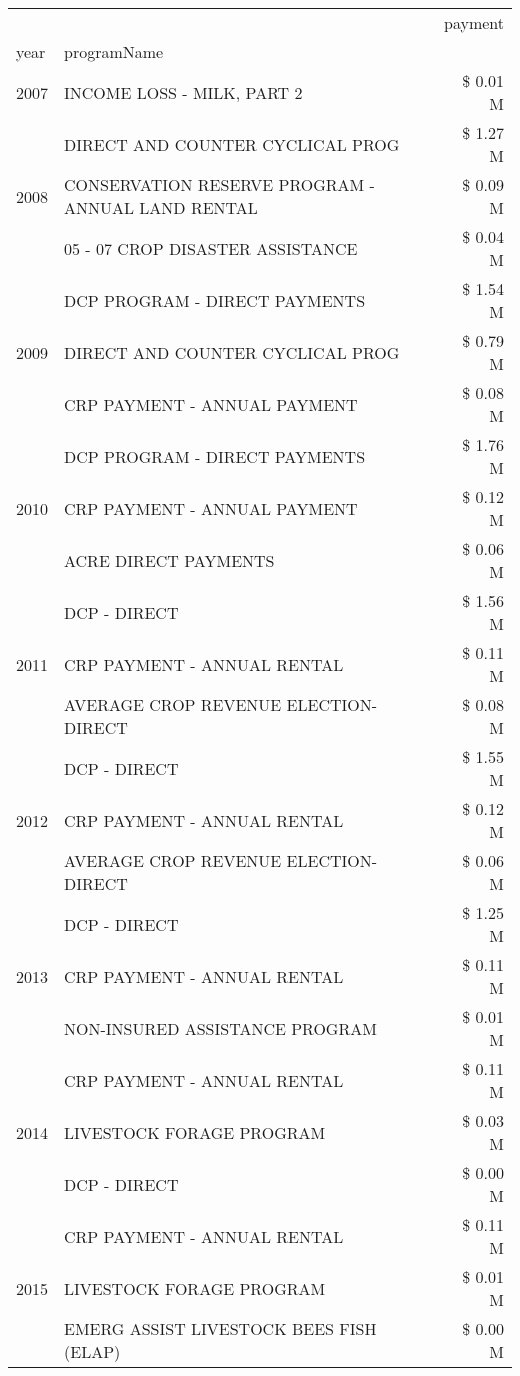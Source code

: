 \begin{tabular}{llr}
\toprule
 &  & payment \\
year & programName &  \\
\midrule
2007 & INCOME LOSS - MILK, PART 2 & \$ 0.01 M \\
\cline{1-3}
\multirow[t]{3}{*}{2008} & DIRECT AND COUNTER CYCLICAL PROG & \$ 1.27 M \\
 & CONSERVATION RESERVE PROGRAM - ANNUAL LAND RENTAL & \$ 0.09 M \\
 & 05 - 07 CROP DISASTER ASSISTANCE & \$ 0.04 M \\
\cline{1-3}
\multirow[t]{3}{*}{2009} & DCP PROGRAM - DIRECT PAYMENTS & \$ 1.54 M \\
 & DIRECT AND COUNTER CYCLICAL PROG & \$ 0.79 M \\
 & CRP PAYMENT - ANNUAL PAYMENT & \$ 0.08 M \\
\cline{1-3}
\multirow[t]{3}{*}{2010} & DCP PROGRAM - DIRECT PAYMENTS & \$ 1.76 M \\
 & CRP PAYMENT - ANNUAL PAYMENT & \$ 0.12 M \\
 & ACRE DIRECT PAYMENTS & \$ 0.06 M \\
\cline{1-3}
\multirow[t]{3}{*}{2011} & DCP - DIRECT & \$ 1.56 M \\
 & CRP PAYMENT - ANNUAL RENTAL & \$ 0.11 M \\
 & AVERAGE CROP REVENUE ELECTION-DIRECT & \$ 0.08 M \\
\cline{1-3}
\multirow[t]{3}{*}{2012} & DCP - DIRECT & \$ 1.55 M \\
 & CRP PAYMENT - ANNUAL RENTAL & \$ 0.12 M \\
 & AVERAGE CROP REVENUE ELECTION-DIRECT & \$ 0.06 M \\
\cline{1-3}
\multirow[t]{3}{*}{2013} & DCP - DIRECT & \$ 1.25 M \\
 & CRP PAYMENT - ANNUAL RENTAL & \$ 0.11 M \\
 & NON-INSURED ASSISTANCE PROGRAM & \$ 0.01 M \\
\cline{1-3}
\multirow[t]{3}{*}{2014} & CRP PAYMENT - ANNUAL RENTAL & \$ 0.11 M \\
 & LIVESTOCK FORAGE PROGRAM & \$ 0.03 M \\
 & DCP - DIRECT & \$ 0.00 M \\
\cline{1-3}
\multirow[t]{3}{*}{2015} & CRP PAYMENT - ANNUAL RENTAL & \$ 0.11 M \\
 & LIVESTOCK FORAGE PROGRAM & \$ 0.01 M \\
 & EMERG ASSIST LIVESTOCK BEES FISH (ELAP) & \$ 0.00 M \\

\end{tabular}
